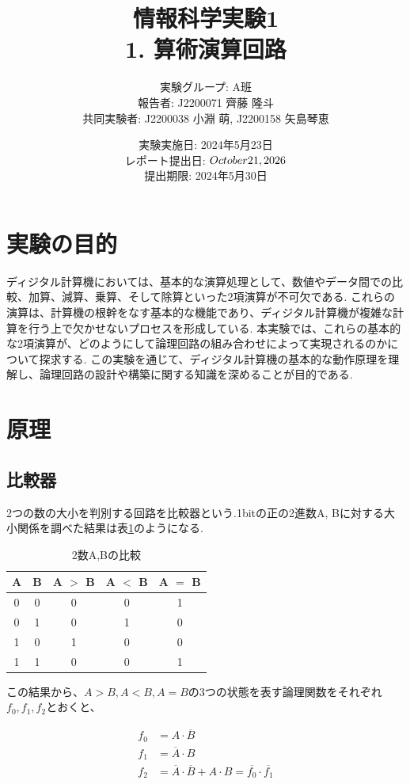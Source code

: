 \documentclass[titlepage]{jsarticle}
\title{情報科学実験1 \\ 1. 算術演算回路}
\author{実験グループ: A班 \\ 報告者: J2200071 齊藤 隆斗 \\ 共同実験者: J2200038 小淵 萌, J2200158 矢島琴恵}
\date{実験実施日: 2024年5月23日 \\ レポート提出日: $\today$ \\ 提出期限: 2024年5月30日}
\theoremstyle{definition}
\begin{document}
\maketitle


\section{実験の目的}
ディジタル計算機においては、基本的な演算処理として、数値やデータ間での比較、加算、減算、乗算、そして除算といった2項演算が不可欠である.
これらの演算は、計算機の根幹をなす基本的な機能であり、ディジタル計算機が複雑な計算を行う上で欠かせないプロセスを形成している.
本実験では、これらの基本的な2項演算が、どのようにして論理回路の組み合わせによって実現されるのかについて探求する.
この実験を通じて、ディジタル計算機の基本的な動作原理を理解し、論理回路の設計や構築に関する知識を深めることが目的である.


\section{原理}

\subsection{比較器}
2つの数の大小を判別する回路を比較器という.1bitの正の2進数A, Bに対する大小関係を調べた結果は表\ref{hikakuki1}のようになる.

\begin{table}[htbp]
	\caption{2数A,Bの比較}
	\label{hikakuki1}
	\centering
	\begin{tabular}{|c|c||c|c|c|} \hline
    	A & B & A $>$ B & A $<$ B & A $=$ B \\ \hline \hline
		0 & 0 & 0 & 0 & 1 \\ \hline
		0 & 1 & 0 & 1 & 0 \\ \hline
		1 & 0 & 1 & 0 & 0 \\ \hline
		1 & 1 & 0 & 0 & 1 \\ \hline
	\end{tabular}
\end{table}

この結果から、$A > B, A < B, A = B$の3つの状態を表す論理関数をそれぞれ$f_0, f_1, f_2$とおくと、

\begin{align}
	f_0 &= A \cdot \overline{B} \\
	f_1 &= \overline{A} \cdot B \\
	f_2 &= \overline{A} \cdot \overline{B} + A \cdot B = \overline{f_0} \cdot \overline{f_1}
\end{align}
\end{document}
